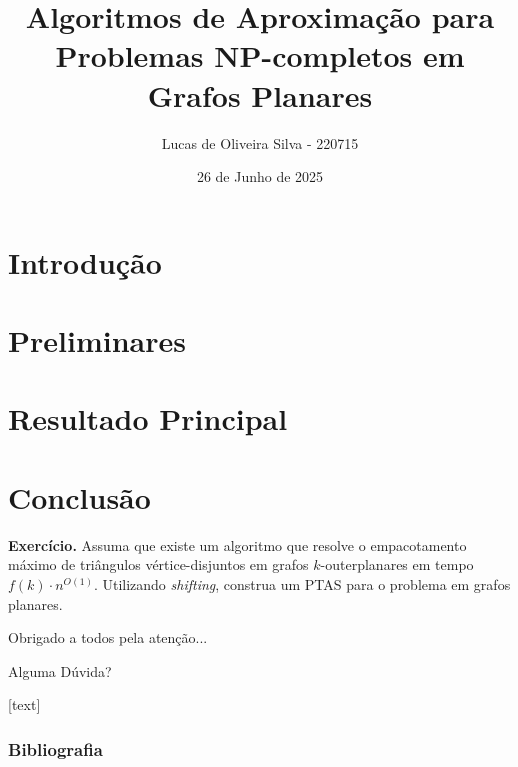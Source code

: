\documentclass[xcolor=table]{beamer}
\title{Algoritmos de Aproximação para Problemas NP-completos em Grafos Planares}
\author{
Lucas de Oliveira Silva - 220715
}
\date{\vfill\hfill 26 de Junho de 2025}
\begin{document}

\begin{frame}[plain]
  \titlepage
\end{frame}


\section{Introdução}


\section{Preliminares}


\section{Resultado Principal}


\section{Conclusão}


\begin{frame}
    \textbf{Exercício.} Assuma que existe um algoritmo que resolve o empacotamento máximo de triângulos vértice-disjuntos em grafos $k$-outerplanares em tempo $f(k) \cdot n^{O(1)}$.
    \pause\bigbreak
    Utilizando \emph{shifting}, construa um PTAS para o problema em grafos planares.
    \pause

    \vfill
    \centering
    \LARGE{\centerline{Obrigado a todos pela atenção...}}
    \Huge{\centerline{Alguma Dúvida?}}
\end{frame}


\appendix

\beamerdefaultoverlayspecification{}
[text]
\begin{frame}
  \frametitle{Bibliografia}
  {
    \tiny
    
    
  }
\end{frame}

\end{document}
